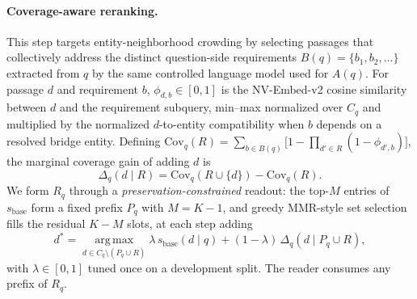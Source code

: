 \paragraph{Coverage-aware reranking.}
This step targets entity-neighborhood crowding by selecting
passages that collectively address the distinct question-side
requirements $B(q)=\{b_1,b_2,\ldots\}$ extracted from $q$ by the
same controlled language model used for $A(q)$. For passage $d$
and requirement $b$, $\phi_{d,b}\in[0,1]$ is the NV-Embed-v2
cosine similarity between $d$ and the requirement subquery,
min--max normalized over $C_q$ and multiplied by the normalized
$d$-to-entity compatibility when $b$ depends on a resolved bridge
entity. Defining
$\mathrm{Cov}_q(R)=\sum_{b\in B(q)}\bigl[1-\prod_{d'\in R}(1-\phi_{d',b})\bigr]$,
the marginal coverage gain of adding $d$ is
\begin{equation}
\label{eq:marginal-gain}
\Delta_q(d \mid R) = \mathrm{Cov}_q(R\cup\{d\}) - \mathrm{Cov}_q(R).
\end{equation}
We form $R_q$ through a \emph{preservation-constrained} readout:
the top-$M$ entries of $s_{\mathrm{base}}$ form a fixed prefix
$P_q$ with $M=K-1$, and greedy MMR-style set selection
\citep{carbonell1998mmr,lin2011submodular} fills the residual
$K-M$ slots, at each step adding
\begin{equation}
\label{eq:greedy-rerank}
d^{*}
=
\operatorname*{arg\,max}_{d \in C_q \setminus (P_q \cup R)}
\lambda\,s_{\mathrm{base}}(d \mid q)
+
(1-\lambda)\,\Delta_q(d \mid P_q \cup R),
\end{equation}
with $\lambda\in[0,1]$ tuned once on a development split. The
reader consumes any prefix of $R_q$.
